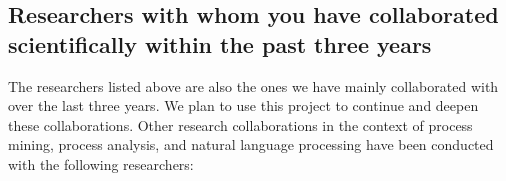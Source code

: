 %
%
%

\subsection{Researchers with whom you have collaborated scientifically within the past three years}


The researchers listed above are also the ones we have mainly collaborated with over the last three years. We plan to use this project to continue and deepen these collaborations. Other research collaborations in the context of process mining, process analysis, and natural language processing have been conducted with the following researchers:

